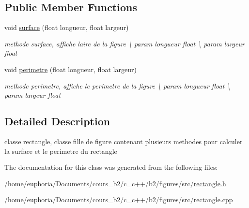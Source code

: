 \subsection*{Public Member Functions}
\begin{DoxyCompactItemize}
\item 
void \hyperlink{classrectangle_a9996c8fd7c082a3cdcea7f6946348794}{surface} (float longueur, float largeur)\hypertarget{classrectangle_a9996c8fd7c082a3cdcea7f6946348794}{}\label{classrectangle_a9996c8fd7c082a3cdcea7f6946348794}

\begin{DoxyCompactList}\small\item\em methode surface, affiche l\textquotesingle{}aire de la figure \textbackslash{} param longueur float \textbackslash{} param largeur float \end{DoxyCompactList}\item 
void \hyperlink{classrectangle_abf7908ec249774c1d68c5285b68271f8}{perimetre} (float longueur, float largeur)\hypertarget{classrectangle_abf7908ec249774c1d68c5285b68271f8}{}\label{classrectangle_abf7908ec249774c1d68c5285b68271f8}

\begin{DoxyCompactList}\small\item\em methode perimetre, affiche le perimetre de la figure \textbackslash{} param longueur float \textbackslash{} param largeur float \end{DoxyCompactList}\end{DoxyCompactItemize}


\subsection{Detailed Description}
classe rectangle, classe fille de figure contenant plusieurs methodes pour calculer la surface et le perimetre du rectangle 

The documentation for this class was generated from the following files\+:\begin{DoxyCompactItemize}
\item 
/home/euphoria/\+Documents/cours\+\_\+b2/c\+\_\+c++/b2/figures/src/\hyperlink{rectangle_8h}{rectangle.\+h}\item 
/home/euphoria/\+Documents/cours\+\_\+b2/c\+\_\+c++/b2/figures/src/rectangle.\+cpp\end{DoxyCompactItemize}
